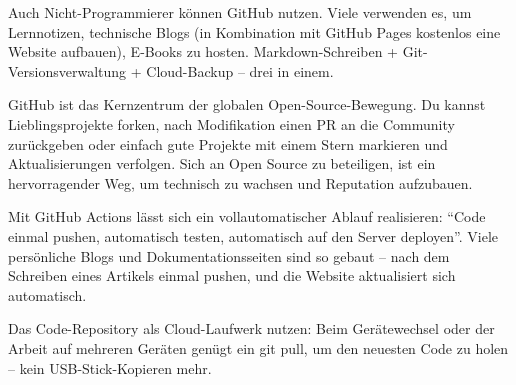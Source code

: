 
Auch Nicht-Programmierer können GitHub nutzen. Viele verwenden es, um Lernnotizen, technische Blogs (in Kombination mit GitHub Pages kostenlos eine Website aufbauen), E-Books zu hosten. Markdown-Schreiben + Git-Versionsverwaltung + Cloud-Backup – drei in einem.


GitHub ist das Kernzentrum der globalen Open-Source-Bewegung. Du kannst Lieblingsprojekte forken, nach Modifikation einen PR an die Community zurückgeben oder einfach gute Projekte mit einem Stern markieren und Aktualisierungen verfolgen. Sich an Open Source zu beteiligen, ist ein hervorragender Weg, um technisch zu wachsen und Reputation aufzubauen.


Mit GitHub Actions lässt sich ein vollautomatischer Ablauf realisieren: “Code einmal pushen, automatisch testen, automatisch auf den Server deployen”. Viele persönliche Blogs und Dokumentationsseiten sind so gebaut – nach dem Schreiben eines Artikels einmal pushen, und die Website aktualisiert sich automatisch.


Das Code-Repository als Cloud-Laufwerk nutzen: Beim Gerätewechsel oder der Arbeit auf mehreren Geräten genügt ein git pull, um den neuesten Code zu holen – kein USB-Stick-Kopieren mehr.


